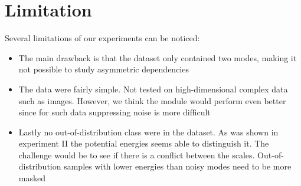 \section{Limitation}
Several limitations of our experiments can be noticed:
\begin{itemize}
\item The main drawback is that the dataset only contained two modes, making it not possible to study asymmetric dependencies
\item The data were fairly simple. Not tested on high-dimensional complex data such as images. However, we think the module would perform even better since for such data suppressing noise is more difficult
\item Lastly no out-of-distribution class were in the dataset. As was shown in experiment II the potential energies seems able to distinguish it. The challenge would be to see if there is a conflict between the scales. Out-of-distribution samples with lower energies than noisy modes need to be more masked
\end{itemize}